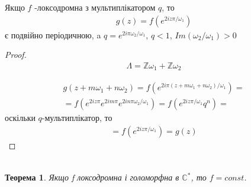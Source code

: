 \documentclass[12pt,a4paper]{article}
\begin{document}
\begin{twerd}
 Якщо $f$  -локсодромна з мультиплікатором $q$, то  
\[\begin{array}{l}
g(z)=f(e^{2iz\pi/\omega_{1}})
\end{array}\] 
є подвійно періодичною, a $q=e^{2i\pi \omega_{2}/ \omega_{1}}$, $q<1$, $Im(\omega_{2}/\omega_{1})>0$
\end{twerd}
\begin{proof}
\[\begin{array}{l}
\Lambda = \mathbb{Z}\omega_{1} + \mathbb{Z}\omega_{2} 
\end{array}\]

\[\begin{array}{l}
g(z+m\omega_{1}+ n\omega_{2})= f(e^{2i\pi(z+m\omega_{1}+ n\omega_{2})/\omega_{1}})=\\
=f( e^{2iz\pi}e^{2im\pi}e^{2in\pi\omega_{2} / \omega_{1}})=
f(e^{2iz\pi/\omega_{1}}q^{n})=
\end{array}\]
 оскільки $q$-мультиплікатор, то
 \[\begin{array}{l}
 =f(e^{2iz\pi/\omega_{1}})=g(z)
 \end{array}\]
\end{proof}
\[\begin{array}{l}
\end{array} \]

\newtheorem{thm}{Теорема}
\begin{thm}
Якщо f локсодромна і голоморфна в $\mathbb{C}^{*}$, то $f=const$.
\end{thm}
\end{document}
